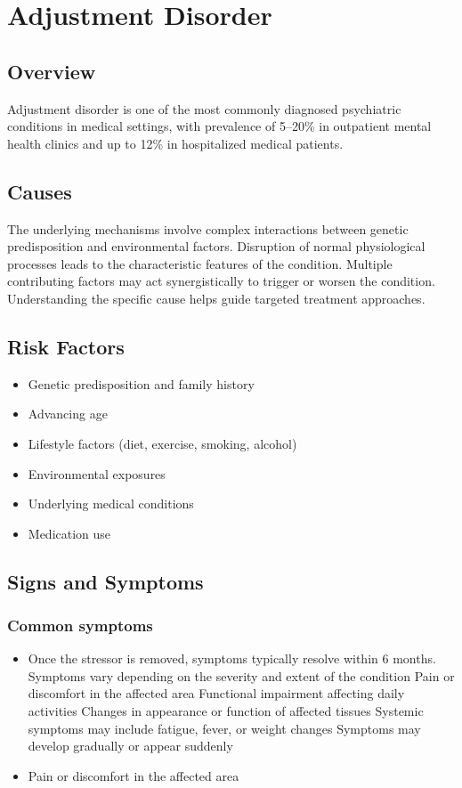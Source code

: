 \chapter{Adjustment Disorder}
\label{sec:Adjustment Disorder}

\section{Overview}
Adjustment disorder is one of the most commonly diagnosed psychiatric conditions in medical settings, with prevalence of 5--20\% in outpatient mental health clinics and up to 12\% in hospitalized medical patients.
\section{Causes}
The underlying mechanisms involve complex interactions between genetic predisposition and environmental factors. Disruption of normal physiological processes leads to the characteristic features of the condition. Multiple contributing factors may act synergistically to trigger or worsen the condition. Understanding the specific cause helps guide targeted treatment approaches.
\section{Risk Factors}


\begin{itemize}[noitemsep]
  \item Genetic predisposition and family history
  \item Advancing age
  \item Lifestyle factors (diet, exercise, smoking, alcohol)
  \item Environmental exposures
  \item Underlying medical conditions
  \item Medication use
\end{itemize}
\section{Signs and Symptoms}

\subsection{Common symptoms}
\begin{itemize}[noitemsep]
  \item Once the stressor is removed, symptoms typically resolve within 6 months. Symptoms vary depending on the severity and extent of the condition Pain or discomfort in the affected area Functional impairment affecting daily activities Changes in appearance or function of affected tissues Systemic symptoms may include fatigue, fever, or weight changes Symptoms may develop gradually or appear suddenly
  \item Pain or discomfort in the affected area
  \end{itemize}

